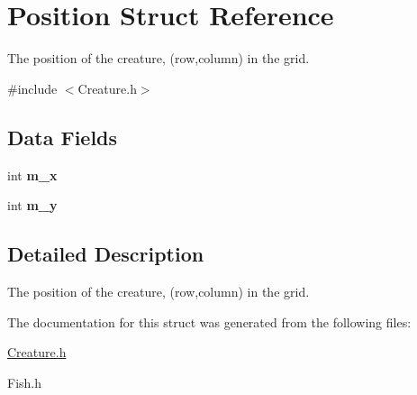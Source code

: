 \hypertarget{structPosition}{\section{\-Position \-Struct \-Reference}
\label{structPosition}
}


\-The position of the creature, (row,column) in the grid.  




{\ttfamily \#include $<$\-Creature.\-h$>$}

\subsection*{\-Data \-Fields}
\begin{DoxyCompactItemize}
\item 
\hypertarget{structPosition_a8e20797ca5de8fe173cf82e194d09aa6}{int {\bfseries m\-\_\-x}}\label{structPosition_a8e20797ca5de8fe173cf82e194d09aa6}

\item 
\hypertarget{structPosition_aa8329db9473b0735954340fe7b9f0377}{int {\bfseries m\-\_\-y}}\label{structPosition_aa8329db9473b0735954340fe7b9f0377}

\end{DoxyCompactItemize}


\subsection{\-Detailed \-Description}
\-The position of the creature, (row,column) in the grid. 

\-The documentation for this struct was generated from the following files\-:\begin{DoxyCompactItemize}
\item 
\hyperlink{Creature_8h}{\-Creature.\-h}\item 
\-Fish.\-h\end{DoxyCompactItemize}
